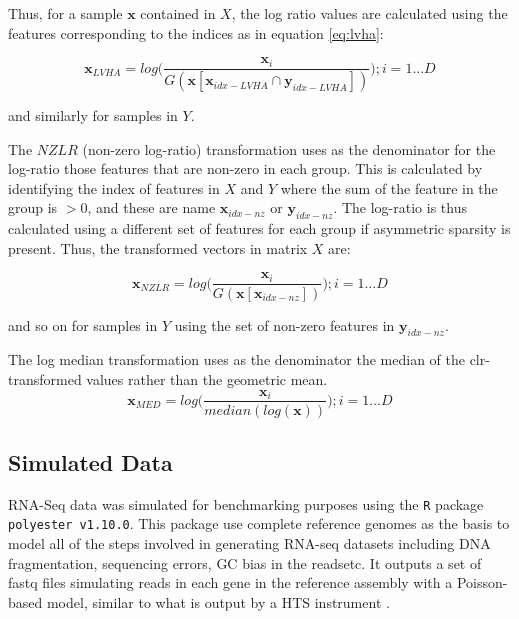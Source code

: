 \documentclass[graybox]{svmult}
\begin{document}
Thus, for a sample $\textbf{x}$ contained in  $X$, the log ratio values are calculated using the features corresponding to the indices as in equation \ref{eq:lvha}:

\begin{equation}
\textbf{x}_{\mathit{LVHA}} = log  \Big( \frac{\textbf{x}_i
}{G(\textbf{x}[\textbf{x}_{idx-LVHA} \cap \textbf{y}_{idx-LVHA} ] )}   \Big)  ;i=1 \dots D 
\label{eq:lvha}
\end{equation}

and similarly for samples in $Y$. 

The $\mathit{NZLR}$ (non-zero log-ratio)  transformation uses as the denominator for the log-ratio those features that are non-zero in each group. This is calculated by identifying the index of features in $X$ and $Y$ where the sum of the feature in the group is $> 0$, and these are name $\textbf{x}_{idx-nz}$ or $\textbf{y}_{idx-nz}$. The log-ratio is thus calculated using a different set of features for each group if asymmetric sparsity is present.  Thus, the transformed vectors in matrix $X$ are:

\begin{equation}
\textbf{x}_\mathit{NZLR} = log \Big( \frac{\textbf{x}_i}{G(\textbf{x}[\textbf{x}_{idx-nz}])} \Big) ;i=1 \dots D 
\label{eq:nzlr}
\end{equation}

and so on for samples in $Y$ using the set of non-zero features in $\textbf{y}_{idx-nz}$.


The log median transformation uses as the denominator the median of the clr-transformed values rather than the geometric mean. 
\begin{equation}
\textbf{x}_{MED} = log \Big( \frac{\textbf{x}_i}{ median(log(\textbf{x}))} \Big) ;i=1 \dots D 
\label{eq:med}
\end{equation}

\subsection*{Simulated Data}
\label{subsec:1.4}
RNA-Seq data was simulated for benchmarking purposes using the \texttt{R} package \texttt{polyester v1.10.0}. This package use complete reference genomes as the basis to model all of the steps involved in generating RNA-seq datasets including DNA fragmentation, sequencing errors, GC bias in the readsetc. It outputs a set of fastq files simulating reads in each gene in the reference assembly with a Poisson-based model, similar to what is output by a HTS instrument \cite{polyester:2016}. 
\end{document}
